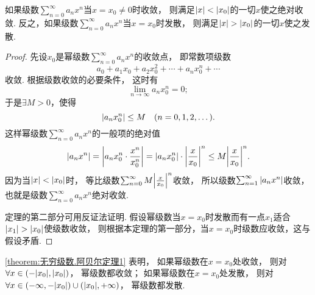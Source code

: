 \begin{theorem}[阿贝尔第一定理]\label{theorem:无穷级数.阿贝尔定理1}
如果级数\(\sum_{n=0}^\infty a_n x^n\)当\(x=x_0\neq0\)时收敛，
则满足\(\abs{x}<\abs{x_0}\)的一切\(x\)使之绝对收敛.
反之，如果级数\(\sum_{n=0}^\infty a_n x^n\)当\(x=x_0\)时发散，
则满足\(\abs{x}>\abs{x_0}\)的一切\(x\)使之发散.
\begin{proof}
先设\(x_0\)是幂级数\(\sum_{n=0}^\infty a_n x^n\)的收敛点，
即常数项级数\[
	a_0 + a_1 x_0 + a_2 x_0^2 + \dotsb + a_n x_0^n + \dotsb
\]收敛.
根据级数收敛的必要条件，
这时有\[
	\lim_{n\to\infty} a_n x_0^n = 0;
\]
于是\(\exists M > 0\)，使得\[
	\abs{a_n x_0^n} \leq M
	\quad(n=0,1,2,\dotsc).
\]
这样幂级数\(\sum_{n=0}^\infty a_n x^n\)的一般项的绝对值\[
	\abs{a_n x^n} = \abs{a_n x_0^n \cdot \frac{x^n}{x_0^n}}
	= \abs{a_n x_0^n} \cdot \abs{\frac{x}{x_0}}^n
	\leq M \abs{\frac{x}{x_0}}^n.
\]
因为当\(\abs{x}<\abs{x_0}\)时，
等比级数\(\sum_{n=0}^\infty M \abs{\frac{x}{x_0}}^n\)收敛，
所以级数\(\sum_{n=1}^\infty \abs{a_n x^n}\)收敛，
也就是级数\(\sum_{n=0}^\infty a_n x^n\)绝对收敛.

定理的第二部分可用反证法证明.
假设幂级数当\(x=x_0\)时发散而有一点\(x_1\)适合\(\abs{x_1}>\abs{x_0}\)使级数收敛，
则根据本定理的第一部分，当\(x=x_0\)时级数应收敛，这与假设矛盾.
\end{proof}
\end{theorem}

\cref{theorem:无穷级数.阿贝尔定理1} 表明，
如果幂级数在\(x=x_0\)处收敛，
则对\(\forall x\in(-\abs{x_0},\abs{x_0})\)，
幂级数都收敛；
如果幂级数在\(x=x_0\)处发散，
则对\(\forall x\in(-\infty,-\abs{x_0})\cup(\abs{x_0},+\infty)\)，
幂级数都发散.


